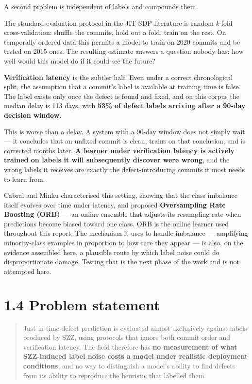 A second problem is independent of labels and compounds them.

The standard evaluation protocol in the JIT-SDP literature is random
\emph{k}-fold cross-validation: shuffle the commits, hold out a fold,
train on the rest. On temporally ordered data this permits a model to
train on 2020 commits and be tested on 2015 ones. The resulting estimate
answers a question nobody has: how well would this model do if it could
see the future?

\textbf{Verification latency} is the subtler half. Even under a correct
chronological split, the assumption that a commit's label is available
at training time is false. The label exists only once the defect is
found and fixed, and on this corpus the median delay is 113 days, with
\textbf{53\% of defect labels arriving after a 90-day decision window.}

This is worse than a delay. A system with a 90-day window does not
simply wait --- it concludes that an unfixed commit is clean, trains on
that conclusion, and is corrected months later. \textbf{A learner under
verification latency is actively trained on labels it will subsequently
discover were wrong}, and the wrong labels it receives are exactly the
defect-introducing commits it most needs to learn from.

Cabral and Minku \citep{cabral2019orb} characterised this setting,
showing that the class imbalance itself evolves over time under latency,
and proposed \textbf{Oversampling Rate Boosting (ORB)} --- an online
ensemble that adjusts its resampling rate when predictions become biased
toward one class. ORB is the online learner used throughout this report.
The mechanism it uses to handle imbalance --- amplifying minority-class
examples in proportion to how rare they appear --- is also, on the
evidence assembled here, a plausible route by which label noise could do
disproportionate damage. Testing that is the next phase of the work and
is not attempted here.

\section{1.4 Problem statement}\label{problem-statement}

\begin{quote}
Just-in-time defect prediction is evaluated almost exclusively against
labels produced by SZZ, using protocols that ignore both commit order
and verification latency. The field therefore has \textbf{no measurement
of what SZZ-induced label noise costs a model under realistic deployment
conditions}, and no way to distinguish a model's ability to find defects
from its ability to reproduce the heuristic that labelled them.
\end{quote}

